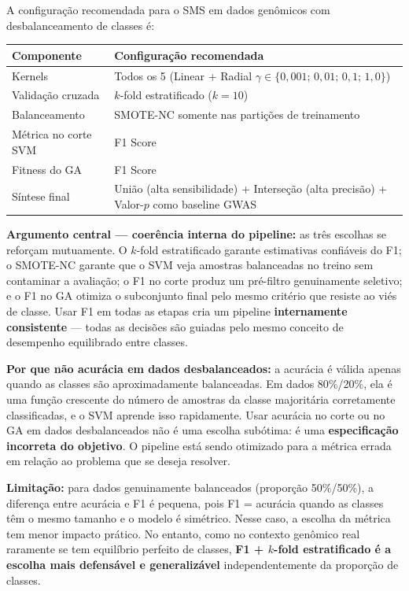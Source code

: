 \documentclass[
    12pt,
    a4paper,
    oneside,
    english,
    french,
    spanish,
    brazil
    ]{abntex2}
\renewcommand{\arraystretch}{1.3}
\newcommand{\novo}[1]{\textcolor{corNova}{#1}}
\begin{document}
\novo{A configuração recomendada para o SMS em dados genômicos com desbalanceamento de classes é:}

\begin{center}
\footnotesize
\renewcommand{\arraystretch}{1.5}
\begin{tabular}{L{4.5cm}|L{9.0cm}}
  \textbf{Componente} & \textbf{Configuração recomendada} \\
  \hline
  Kernels & Todos os 5 (Linear + Radial $\gamma \in \{0{,}001;\, 0{,}01;\, 0{,}1;\, 1{,}0\}$) \\
  \hline
  Validação cruzada & $k$-fold estratificado ($k = 10$) \\
  \hline
  Balanceamento & SMOTE-NC somente nas partições de treinamento \\
  \hline
  Métrica no corte SVM & F1 Score \\
  \hline
  Fitness do GA & F1 Score \\
  \hline
  Síntese final & União (alta sensibilidade) + Interseção (alta precisão) + Valor-$p$ como baseline GWAS \\
\end{tabular}
\end{center}
\renewcommand{\arraystretch}{1.3}

\novo{\textbf{Argumento central --- coerência interna do pipeline:} as três escolhas se reforçam mutuamente. O $k$-fold estratificado garante estimativas confiáveis do F1; o SMOTE-NC garante que o SVM veja amostras balanceadas no treino sem contaminar a avaliação; o F1 no corte produz um pré-filtro genuinamente seletivo; e o F1 no GA otimiza o subconjunto final pelo mesmo critério que resiste ao viés de classe. Usar F1 em todas as etapas cria um pipeline \textbf{internamente consistente} --- todas as decisões são guiadas pelo mesmo conceito de desempenho equilibrado entre classes.}

\novo{\textbf{Por que não acurácia em dados desbalanceados:} a acurácia é válida apenas quando as classes são aproximadamente balanceadas. Em dados 80\%/20\%, ela é uma função crescente do número de amostras da classe majoritária corretamente classificadas, e o SVM aprende isso rapidamente. Usar acurácia no corte ou no GA em dados desbalanceados não é uma escolha subótima: é uma \textbf{especificação incorreta do objetivo}. O pipeline está sendo otimizado para a métrica errada em relação ao problema que se deseja resolver.}

\novo{\textbf{Limitação:} para dados genuinamente balanceados (proporção 50\%/50\%), a diferença entre acurácia e F1 é pequena, pois F1 = acurácia quando as classes têm o mesmo tamanho e o modelo é simétrico. Nesse caso, a escolha da métrica tem menor impacto prático. No entanto, como no contexto genômico real raramente se tem equilíbrio perfeito de classes, \textbf{F1 + $k$-fold estratificado é a escolha mais defensável e generalizável} independentemente da proporção de classes.}
\end{document}
